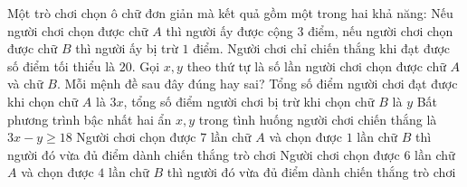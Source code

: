 \begin{ex}%
	Một trò chơi chọn ô chữ đơn giản mà kết quả gồm một trong hai khả năng: Nếu người chơi chọn được chữ $A$ thì người ấy được cộng $3$ điểm, nếu người chơi chọn được chữ $B$ thì người ấy bị trừ $1$ điểm. Người chơi chỉ chiến thắng khi đạt được số điểm tối thiểu là $20$. Gọi $x,y$  theo thứ tự là số lần người chơi chọn được chữ $A$ và chữ $B$. Mỗi mệnh đề sau đây đúng hay sai?
	\choiceTF
	{\True Tổng số điểm người chơi đạt được khi chọn chữ $A$ là $3x$, tổng số điểm người chơi bị trừ khi chọn chữ $B$ là $y$}
	{Bất phương trình bậc nhất hai ẩn $x,y$ trong tình huống người chơi chiến thắng là $3x-y\ge 18$}
	{\True Người chơi chọn được $7$ lần chữ $A$ và chọn được $1$ lần chữ $B$ thì người đó vừa đủ điểm dành chiến thắng trò chơi}
	{Người chơi chọn được $6$ lần chữ $A$ và chọn được $4$ lần chữ $B$ thì người đó vừa đủ điểm dành chiến thắng trò chơi}
\end{ex}

